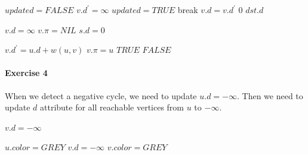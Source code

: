 \documentclass{book}
\begin{document}
	\begin{algorithm*}[h!]
		\begin{algorithmic}[1]
				\State {}
				 
					\State $updated = FALSE$
						\State $v.d^\prime = \infty$
					\EndFor
							\State $updated = TRUE$
						\EndIf
					\EndFor
						\State break
					\EndIf
						\State $v.d = v.d^\prime$
					\EndFor
				\EndFor
					\State \Return $0$
				\Else
					\State \Return $dst.d$
				\EndIf
			\EndFunction
		\end{algorithmic}
			\begin{algorithmic}[1]
						\State $v.d = \infty$
						\State $v.\pi = NIL$
					\EndFor
					\State $s.d = 0$
				\EndFunction
			\end{algorithmic}		
		
			\begin{algorithmic}[1]
						\State $v.d^\prime = u.d + w(u, v)$
						\State $v.\pi = u$
						\State \Return $TRUE$
					\Else
						\State \Return $FALSE$
					\EndIf
			\EndFunction
		\end{algorithmic}
	\end{algorithm*}
	\FloatBarrier
	
	\paragraph{Exercise 4}
	When we detect a negative cycle, we need to update $u.d = -\infty$. Then we need to update $d$ attribute for all reachable vertices from $u$ to $-\infty$.
	\begin{algorithm*}[h!]
		\begin{algorithmic}[1]
				\State {}
						\State {}
					\EndFor
				\EndFor
				\State {}
						\State $v.d = -\infty$
						\State {}
					\EndIf
				\EndFor
			\EndFunction
		\end{algorithmic}
	\end{algorithm*}
	\begin{algorithm*}[h!]
		\begin{algorithmic}[1]
				\State $u.color = GREY$
						\State $v.d = -\infty$
						\State $v.color = GREY$
						\State {}
					\EndIf
				\EndFor
			\EndFunction
		\end{algorithmic}
	\end{algorithm*}
	\FloatBarrier
\end{document}
